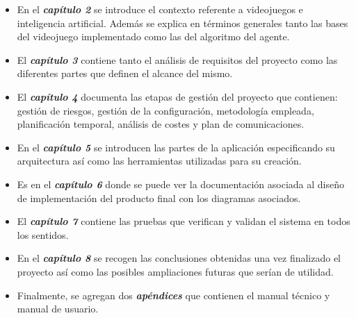 \begin{itemize}
	\item En el \textbf{\textit{capítulo 2}} se introduce el contexto referente a videojuegos e inteligencia artificial. Además se explica en términos generales tanto las bases del videojuego implementado como las del algoritmo del agente.
	\item El \textbf{\textit{capítulo 3}} contiene tanto el análisis de requisitos del proyecto como las diferentes partes que definen el alcance del mismo.
	\item El \textbf{\textit{capítulo 4}} documenta las etapas de gestión del proyecto que contienen: gestión de riesgos, gestión de la configuración, metodología empleada, planificación temporal, análisis de costes y plan de comunicaciones.
	\item En el \textbf{\textit{capítulo 5}} se introducen las partes de la aplicación especificando su arquitectura así como las herramientas utilizadas para su creación.
	\item Es en el \textbf{\textit{capítulo 6}} donde se puede ver la documentación asociada al diseño de implementación del producto final con los diagramas asociados.
	\item El \textbf{\textit{capítulo 7}} contiene las pruebas que verifican y validan el sistema en todos los sentidos.
	\item En el \textbf{\textit{capítulo 8}} se recogen las conclusiones obtenidas una vez finalizado el proyecto así como las posibles ampliaciones futuras que serían de utilidad.
	\item Finalmente, se agregan dos \textbf{\textit{apéndices}} que contienen el manual técnico y manual de usuario.
\end{itemize}



